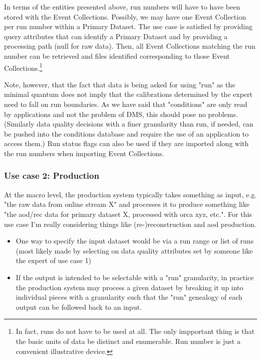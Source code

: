 \documentclass{cmspaper}
\begin{document}
In terms of the entities presented above, run numbers will have to have been 
stored with the Event Collections.  Possibly, we may have one Event Collection
per run number within a Primary Dataset.  The use case is satisfied by 
providing query attributes that can identify a Primary Dataset and by 
providing a processing path (null for raw data).  Then, all 
Event Collections matching the run number can be retrieved and files 
identified corresponding to those Event Collections.\footnote{In fact, runs 
do not have to be used at all.  The only impportant thing is that the 
basic units of data be distinct and enumerable.  Run number is just a convenient 
illustrative device.}

Note, however, that the fact that data is being asked for using "run" as
the minimal quantum does not imply that the calibrations determined by
the expert need to fall on run boundaries. As we have said that "conditions"
are only read by applications and not the problem of DMS, this should pose no
problems. (Similarly data quality decisions with a finer granularity than 
run, if needed, can be pushed into the conditions database and require 
the use of an application to access them.)  Run status flags can also be used 
if they are imported along with the run numbers when importing Event Collections.

\subsubsection{Use case 2: Production}
\label{sec:UCprod}

  At the macro level, the production system typically takes something 
as input, e.g. "the raw data from online stream X" and processes it to
produce something like "the aod/rec data for primary dataset X, processed
with orca xyz, etc.". For this use case I'm really considering things
like (re-)reconstruction and aod production.


\begin{itemize}
\item One way to specify the input dataset would be via a run range or list
     of runs (most likely made by selecting on data quality attributes set by
     someone like the expert of use case 1)
\item If the output is intended to be selectable with a "run" granularity,
     in practice the production system may process a given dataset by 
     breaking it up into individual pieces with a granularity such that
     the "run" genealogy of each output can be followed back to an input.
\end{itemize}
\end{document}
